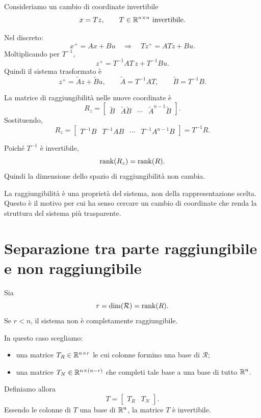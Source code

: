 Consideriamo un cambio di coordinate invertibile
\begin{equation}
x=Tz,
\qquad T\in\mathbb{R}^{n\times n}\ \text{invertibile}.
\end{equation}

Nel discreto:
\[
x^{+}=Ax+Bu
\quad \Longrightarrow \quad
Tz^{+}=ATz+Bu.
\]
Moltiplicando per \(T^{-1}\),
\[
z^{+}=T^{-1}AT\,z+T^{-1}Bu.
\]
Quindi il sistema trasformato è
\begin{equation}
z^{+}=\tilde A z+\tilde B u,
\qquad
\tilde A=T^{-1}AT,\qquad \tilde B=T^{-1}B.
\end{equation}

La matrice di raggiungibilità nelle nuove coordinate è
\[
R_z=
\begin{bmatrix}
\tilde B & \tilde A\tilde B & \cdots & \tilde A^{n-1}\tilde B
\end{bmatrix}.
\]
Sostituendo,
\[
R_z=
\begin{bmatrix}
T^{-1}B & T^{-1}AB & \cdots & T^{-1}A^{n-1}B
\end{bmatrix}
= T^{-1}R.
\]

Poiché \(T^{-1}\) è invertibile,
\[
\rank(R_z)=\rank(R).
\]
Quindi la dimensione dello spazio di raggiungibilità non cambia.

\begin{osservazione}
La raggiungibilità è una proprietà del sistema, non della rappresentazione scelta.  
Questo è il motivo per cui ha senso cercare un cambio di coordinate che renda la struttura del sistema più trasparente.
\end{osservazione}

\section{Separazione tra parte raggiungibile e non raggiungibile}

Sia
\[
r=\dim(\mathcal{R})=\rank(R).
\]
Se \(r<n\), il sistema non è completamente raggiungibile.

In questo caso scegliamo:
\begin{itemize}
    \item una matrice \(T_R\in\mathbb{R}^{n\times r}\) le cui colonne formino una base di \(\mathcal{R}\);
    \item una matrice \(T_N\in\mathbb{R}^{n\times(n-r)}\) che completi tale base a una base di tutto \(\mathbb{R}^n\).
\end{itemize}

Definiamo allora
\begin{equation}
T=\begin{bmatrix}
T_R & T_N
\end{bmatrix}.
\end{equation}
Essendo le colonne di \(T\) una base di \(\mathbb{R}^n\), la matrice \(T\) è invertibile.

